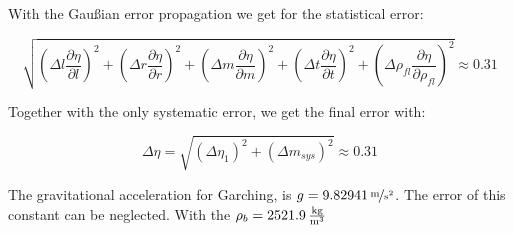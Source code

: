 With the Gaußian error propagation we get for the statistical error:

\begin{equation}
\sqrt{
\left(\Delta l\frac{\partial \eta}{\partial l}\right)^2
+
\left(\Delta r\frac{\partial \eta}{\partial r}\right)^2
+
\left(\Delta m\frac{\partial \eta}{\partial m}\right)^2
+
\left(\Delta t\frac{\partial \eta}{\partial t}\right)^2
+
\left(\Delta \rho_{fl}\frac{\partial \eta}{\partial \rho_{fl}}\right)^2
} \approx 0.31
\end{equation}

Together with the only systematic error, we get the final error with:

\begin{equation}
\Delta \eta = \sqrt{\left(\Delta \eta_1\right)^2 + \left(\Delta m_{sys}\right)^2} \approx 0.31
\end{equation}

The gravitational acceleration for Garching, is $g = \unitfrac[9.82941]{m}{s^2}$. The error of this constant can be neglected. With the $\rho_b = \unit[2521.9]{\frac{kg}{m^3}}$



